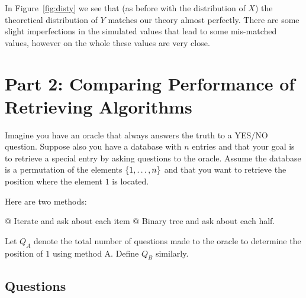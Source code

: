 \documentclass[11pt]{article}
\begin{document}
\begin{easylist}[enumerate]
        In Figure~\ref{fig:disty} we see that (as before with the distribution
        of $X$) the theoretical distribution of $Y$ matches our theory almost
        perfectly. There are some slight imperfections in the simulated values
        that lead to some mis-matched values, however on the whole these values
        are very close.
    \end{easylist}

\section{Part 2: Comparing Performance of Retrieving Algorithms}
Imagine you have an oracle that always answers the truth to a YES/NO question.
Suppose also you have a database with $n$ entries and that your goal is to
retrieve a special entry by asking questions to the oracle. Assume the database
is a permutation of the elements $\left\{ 1, \ldots, n \right\}$ and that you want to
retrieve the position where the element $1$ is located.

Here are two methods:

\begin{easylist}[itemize]
    @ Iterate and ask about each item
    @ Binary tree and ask about each half.
\end{easylist}

Let $Q_A$ denote the total number of questions made to the oracle to determine
the position of $1$ using method A. Define $Q_B$ similarly. 

\subsection{Questions}
\end{document}
